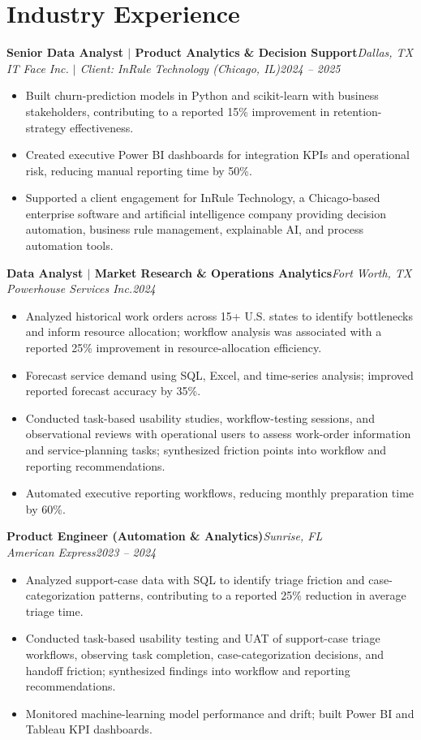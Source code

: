 \documentclass[10pt,a4paper]{article}
\newcommand{\job}[4]{\textbf{#1}\hfill\textit{#2}\\\textit{#3}\hfill\textit{#4}\par\vspace{-3pt}}
\begin{document}
\section{Industry Experience}
\job{Senior Data Analyst $|$ Product Analytics \& Decision Support}{Dallas, TX}{IT Face Inc. $|$ Client: InRule Technology (Chicago, IL)}{2024 -- 2025}
\begin{itemize}\item Built churn-prediction models in Python and scikit-learn with business stakeholders, contributing to a reported 15\% improvement in retention-strategy effectiveness.\item Created executive Power BI dashboards for integration KPIs and operational risk, reducing manual reporting time by 50\%.\item Supported a client engagement for InRule Technology, a Chicago-based enterprise software and artificial intelligence company providing decision automation, business rule management, explainable AI, and process automation tools.\end{itemize}
\job{Data Analyst $|$ Market Research \& Operations Analytics}{Fort Worth, TX}{Powerhouse Services Inc.}{2024}
\begin{itemize}\item Analyzed historical work orders across 15+ U.S. states to identify bottlenecks and inform resource allocation; workflow analysis was associated with a reported 25\% improvement in resource-allocation efficiency.\item Forecast service demand using SQL, Excel, and time-series analysis; improved reported forecast accuracy by 35\%.\item Conducted task-based usability studies, workflow-testing sessions, and observational reviews with operational users to assess work-order information and service-planning tasks; synthesized friction points into workflow and reporting recommendations.\item Automated executive reporting workflows, reducing monthly preparation time by 60\%.\end{itemize}
\job{Product Engineer (Automation \& Analytics)}{Sunrise, FL}{American Express}{2023 -- 2024}
\begin{itemize}\item Analyzed support-case data with SQL to identify triage friction and case-categorization patterns, contributing to a reported 25\% reduction in average triage time.\item Conducted task-based usability testing and UAT of support-case triage workflows, observing task completion, case-categorization decisions, and handoff friction; synthesized findings into workflow and reporting recommendations.\item Monitored machine-learning model performance and drift; built Power BI and Tableau KPI dashboards.\end{itemize}
\end{document}
